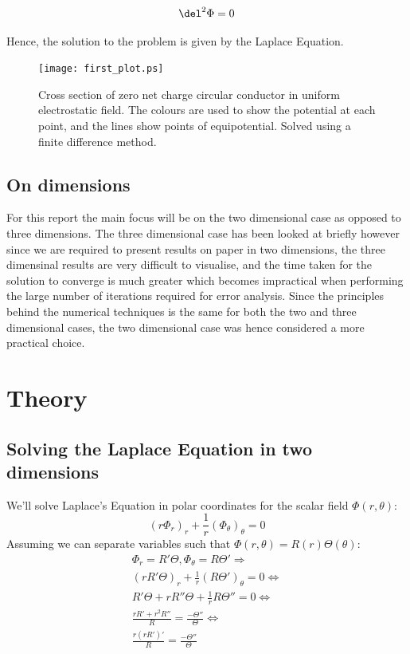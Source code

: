 \documentclass[aps,twocolumn,pre,nofootinbib,10pt]{revtex4-1}
\begin{document}
\begin{gather}
\del^2\Phi=0
\label{fig:eqn4}
\end{gather}

Hence, the solution to the problem is given by the Laplace Equation.

\begin{figure}[h]
\texttt{[image: first\_plot.ps]} 
\caption{Cross section of zero net charge circular conductor in uniform electrostatic field. The colours are used to show the potential at each point, and the lines show points of equipotential. Solved using a finite difference method.}
\label{fig:fig1}
\end{figure}

\subsection{On dimensions}

For this report the main focus will be on the two dimensional case as opposed to three dimensions. The three dimensional case has been looked at briefly however since we are required to present results on paper in two dimensions, the three dimensinal results are very difficult to visualise, and the time taken for the solution to converge is much greater which becomes impractical when performing the large number of iterations required for error analysis. Since the principles behind the numerical techniques is the same for both the two and three dimensional cases, the two dimensional case was hence considered a more practical choice.


\section{Theory \label{sec:the}}

\subsection{Solving the Laplace Equation in two dimensions}
We'll solve Laplace's Equation in polar coordinates for the scalar field $\Phi(r, \theta)$:
\[ \left( r \Phi_r \right)_r + \frac{1}{r} \left(\Phi_\theta \right)_\theta = 0 \]
Assuming we can separate variables such that $\Phi(r, \theta) = R(r)\Theta(\theta)$:
\begin{gather*}
 \Phi_r = R'\Theta, \Phi_\theta = R\Theta' \Rightarrow \\
 (rR'\Theta)_r + \frac{1}{r}(R\Theta')_\theta = 0 \Leftrightarrow \\
 R'\Theta + rR''\Theta + \frac{1}{r}R\Theta'' = 0 \Leftrightarrow \\
 \frac{rR' + r^2 R''}{R} = \frac{- \Theta''}{\Theta} \Leftrightarrow \\
 \frac{r(rR')'}{R} = \frac{- \Theta''}{\Theta}
\end{gather*}
\end{document}
